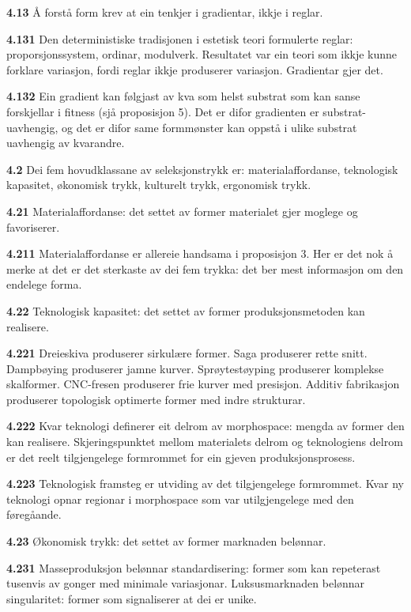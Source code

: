 \documentclass[11pt, a4paper]{article}
\newcommand{\subprop}[1]{\medskip\noindent\textbf{#1}\quad}
\begin{document}
\subprop{4.13} \AA{} forst\aa{} form krev at ein tenkjer i gradientar, ikkje i reglar.

\subprop{4.131} Den deterministiske tradisjonen i estetisk teori formulerte reglar: proporsjonssystem, ordinar, modulverk. Resultatet var ein teori som ikkje kunne forklare variasjon, fordi reglar ikkje produserer variasjon. Gradientar gjer det.

\subprop{4.132} Ein gradient kan f\o lgjast av kva som helst substrat som kan sanse forskjellar i fitness (sj\aa{} proposisjon 5). Det er difor gradienten er substrat-uavhengig, og det er difor same formm\o nster kan oppst\aa{} i ulike substrat uavhengig av kvarandre.

\subprop{4.2} Dei fem hovudklassane av seleksjonstrykk er: materialaffordanse, teknologisk kapasitet, \o konomisk trykk, kulturelt trykk, ergonomisk trykk.

\subprop{4.21} Materialaffordanse: det settet av former materialet gjer moglege og favoriserer.

\subprop{4.211} Materialaffordanse er allereie handsama i proposisjon 3. Her er det nok \aa{} merke at det er det sterkaste av dei fem trykka: det ber mest informasjon om den endelege forma.

\subprop{4.22} Teknologisk kapasitet: det settet av former produksjonsmetoden kan realisere.

\subprop{4.221} Dreieskiva produserer sirkul\ae re former. Saga produserer rette snitt. Dampb\o ying produserer jamne kurver. Spr\o ytest\o yping produserer komplekse skalformer. CNC-fresen produserer frie kurver med presisjon. Additiv fabrikasjon produserer topologisk optimerte former med indre strukturar.

\subprop{4.222} Kvar teknologi definerer eit delrom av morphospace: mengda av former den kan realisere. Skjeringspunktet mellom materialets delrom og teknologiens delrom er det reelt tilgjengelege formrommet for ein gjeven produksjonsprosess.

\subprop{4.223} Teknologisk framsteg er utviding av det tilgjengelege formrommet. Kvar ny teknologi opnar regionar i morphospace som var utilgjengelege med den f\o reg\aa ande.

\subprop{4.23} \O konomisk trykk: det settet av former marknaden bel\o nnar.

\subprop{4.231} Masseproduksjon bel\o nnar standardisering: former som kan repeterast tusenvis av gonger med minimale variasjonar. Luksusmarknaden bel\o nnar singularitet: former som signaliserer at dei er unike.
\end{document}
